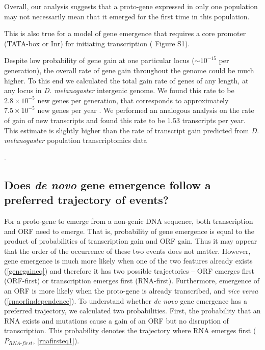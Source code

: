 \documentclass[12pt,a4paper]{article}
\newcommand{\cmnt}[1]{{\color{purple} #1}}
\begin{document}
Overall, our analysis suggests that a proto-gene expressed in only one population may not necessarily mean that it emerged for the first time in this population. \cmnt{This is also true for a model of gene emergence that requires a core promoter (TATA-box or Inr) for initiating transcription ({\color{blue} Figure S1}). 

Despite low probability of gene gain at one particular locus ($\sim 10^{-15}$ per generation), the overall rate of gene gain throughout the genome could be much higher. To this end we calculated the total gain rate of genes of any length, at any locus in \textit{D. melanogaster} intergenic genome. We found this rate to be $2.8\times 10^{-5}$ new genes per generation, that corresponds to approximately $7.5\times 10^{-5}$ new genes per year \citep[assuming \textit{D. melanogaster} generation time of two weeks;][]{drosophilaModelOrg}. We performed an analogous analysis on the rate of gain of new transcripts and found this rate to be 1.53 transcripts per year. This estimate is slightly higher than the rate of transcript gain predicted from \textit{D. melanogaster} population transcriptomics data \citep[0.13 -- 0.34;][]{AnnaPeteTranscripts}}. 

\subsection{Does \textit{de novo} gene emergence follow a preferred trajectory of events?}

For a proto-gene to emerge from a non-genic DNA sequence, both transcription and ORF need to emerge. That is, probability of gene emergence is equal to the product of probabilities of transcription gain and ORF gain. Thus it may appear that the order of the occurrence of these two events does not matter. However, gene emergence is much more likely when one of the two features already exists (\autoref{genegaineq}) and therefore it has two possible trajectories -- ORF emerges first (ORF-first) or transcription emerges first (RNA-first). Furthermore, emergence of an ORF is more likely when the proto-gene is already transcribed, and \textit{vice versa} (\autoref{rnaorfindependence}). To understand whether \textit{de novo} gene emergence has a preferred trajectory, we calculated two probabilities. First, the probability that an RNA exists and mutations cause a gain of an ORF but no disruption of transcription. This probability denotes the trajectory where RNA emerges first ($P_\textit{RNA-first}$, \autoref{rnafirsteq1}). 
\end{document}
